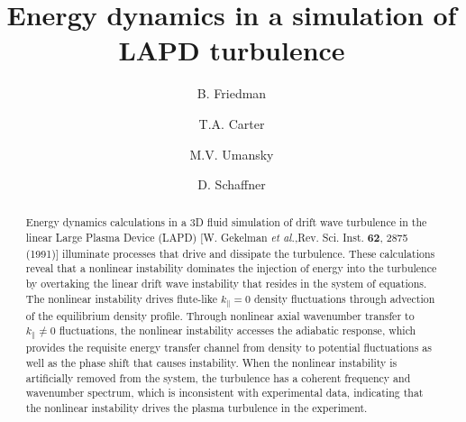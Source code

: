 \documentclass[showpacs,preprintnumbers,amsmath,amssymb,superscriptaddress]{revtex4}
\begin{document}
\title{Energy dynamics in a simulation of LAPD turbulence}

\author{B. Friedman}

\author{T.A. Carter}


\author{M.V. Umansky}

\author{D. Schaffner}






\begin{abstract}
Energy dynamics calculations in a 3D fluid simulation of drift wave turbulence in the linear Large Plasma Device (LAPD) [W. Gekelman \emph{et al.},Rev. Sci. Inst. {\bf 62}, 2875 (1991)]
illuminate processes that drive and dissipate the turbulence.
These calculations reveal that a nonlinear instability dominates the injection of energy into the turbulence by overtaking the linear drift wave instability that resides in the system of equations.
The nonlinear instability drives flute-like $k_\parallel = 0$ density fluctuations through advection of the equilibrium density profile. 
Through nonlinear axial wavenumber transfer to $k_\parallel \ne 0$ fluctuations, the nonlinear instability accesses the adiabatic response, 
which provides the requisite energy transfer channel from density to potential fluctuations as well as the
phase shift that causes instability. When the nonlinear instability is artificially removed from the system, the turbulence has a coherent frequency and wavenumber spectrum, which is inconsistent
with experimental data, indicating that the nonlinear instability drives the plasma turbulence in the experiment.
\end{abstract}

\maketitle
\end{document}
